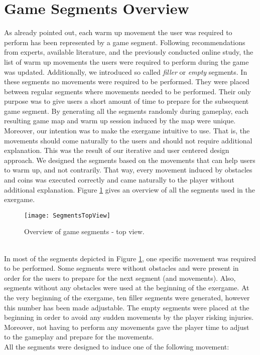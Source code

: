 \section{Game Segments Overview}
As already pointed out, each warm up movement the user was required to perform has been represented by a game segment. Following recommendations from experts, available literature, and the previously conducted online study, the list of warm up movements the users were required to perform during the game was updated. Additionally, we introduced so called \textit{filler} or \textit{empty} segments. In these segments no movements were required to be performed. They were placed between regular segments where movements needed to be performed. Their only purpose was to give users a short amount of time to prepare for the subsequent game segment. By generating all the segments randomly during gameplay, each resulting game map and warm up session induced by the map were unique. Moreover, our intention was to make the exergame intuitive to use. That is, the movements should come naturally to the users and should not require additional explanation. This was the result of our iterative and user centered design approach. We designed the segments based on the movements that can help users to warm up, and not contrarily. That way, every movement induced by obstacles and coins was executed correctly and came naturally to the player without additional explanation. Figure \ref{fig:topview} gives an overview of all the segments used in the exergame.\pagebreak
\begin{figure}[h]
    \centering
    \texttt{[image: SegmentsTopView]}
    \caption{Overview of game segments - top view.}
    \label{fig:topview}
\end{figure}\\
In most of the segments depicted in Figure \ref{fig:topview}, one specific movement was required to be performed. Some segments were without obstacles and were present in order for the users to prepare for the next segment (and movements). Also, segments without any obstacles were used at the beginning of the exergame. At the very beginning of the exergame, ten filler segments were generated, however this number has been made adjustable. The empty segments were placed at the beginning in order to avoid any sudden movements by the player risking injuries. Moreover, not having to perform any movements gave the player time to adjust to the gameplay and prepare for the movements.\\
All the segments were designed to induce one of the following movement:
